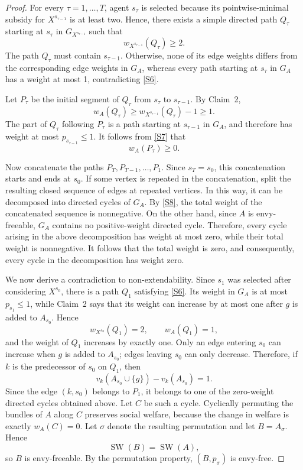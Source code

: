 \documentclass[sigconf,anonymous,nonacm]{aamas}
\begin{document}
\begin{proof}
For every $\tau=1,\ldots,T$, agent $s_\tau$ is selected because its pointwise-minimal subsidy for $X^{s_{\tau-1}}$ is at least two. Hence, there exists a simple directed path $Q_\tau$ starting
at $s_\tau$ in $G_{X^{s_{\tau-1}}}$ such that
\begin{equation}\label{S6}
w_{X^{s_{\tau-1}}}(Q_\tau)\geq2.
\end{equation}
The path $Q_\tau$ must contain $s_{\tau-1}$. Otherwise, none of its edge weights differs from the corresponding edge weights in $G_A$, whereas every path starting at $s_\tau$ in $G_A$ has a weight at most 1, contradicting \eqref{S6}.



Let $P_\tau$ be the initial segment of $Q_\tau$ from $s_\tau$ to $s_{\tau-1}$. By Claim~2,
\begin{equation}\label{S7}
 w_A(Q_\tau)
\geq
w_{X^{s_{\tau-1}}}(Q_\tau)-1
\geq1.   
\end{equation}
The part of $Q_\tau$ following $P_\tau$ is a path starting at $s_{\tau-1}$ in $G_A$, and therefore has weight at most $p_{s_{\tau-1}}\leq1$. It follows from \eqref{S7} that
\begin{equation}\label{S8}
w_A(P_\tau)\geq0.
\end{equation}

Now concatenate the paths $P_T,P_{T-1},\ldots,P_1$. Since $s_T=s_0$, this concatenation starts and ends at $s_0$. If some vertex is repeated in the concatenation, split the resulting closed sequence of edges at repeated vertices. In this way, it can be decomposed into directed cycles of $G_A$. By \eqref{S8}, the total weight of the concatenated sequence is nonnegative. On the other hand, since $A$ is envy-freeable, $G_A$ contains no positive-weight directed cycle. Therefore, every cycle arising in the above decomposition has weight at most zero, while their total weight is nonnegative. It follows that the total weight is zero, and consequently, every cycle in the decomposition has weight zero.

We now derive a contradiction to non-extendability. Since $s_1$ was selected after considering $X^{s_0}$, there is a path $Q_1$ satisfying \eqref{S6}. Its weight in $G_A$ is at most $p_{s_1}\leq1$, while Claim~2 says that its weight can increase by at most one after $g$ is added to $A_{s_0}$. Hence
\[
w_{X^{s_0}}(Q_1)=2,
\qquad
w_A(Q_1)=1,
\]
and the weight of $Q_1$ increases by exactly one. Only an edge entering $s_0$ can increase when $g$ is added to $A_{s_0}$; edges leaving $s_0$ can only decrease. Therefore, if $k$ is the predecessor of $s_0$ on $Q_1$, then
\begin{equation}\label{S9}
v_k(A_{s_0}\cup\{g\})-v_k(A_{s_0})=1.
\end{equation}
Since the edge $(k,s_0)$ belongs to $P_1$, it belongs to one of the zero-weight directed cycles obtained above. Let $C$ be such a cycle. Cyclically permuting the bundles of $A$ along $C$ preserves social welfare, because the change in welfare is exactly $w_A(C)=0$. Let $\sigma$ denote the resulting permutation and let $B=A_\sigma$. Hence
\[
\operatorname{SW}(B)=\operatorname{SW}(A),
\] so $B$ is envy-freeable. By the permutation property, $(B,p_\sigma)$ is envy-free.


\end{proof}
\end{document}
